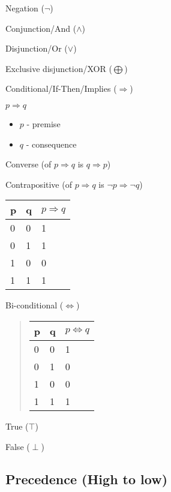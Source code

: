 \documentclass[12pt]{article}
\begin{document}
\begin{spacing}{1.5}
\begin{itemize*}
	\item Negation ($\neg$)
	\item Conjunction/And ($\wedge$)
	\item Disjunction/Or ($\vee$)
	\item Exclusive disjunction/XOR ($\bigoplus$)
	\item Conditional/If-Then/Implies ($\Rightarrow$)
		\begin{itemize*}
		    \item $p \Rightarrow q$
	    		\begin{itemize}
			        \item $p$ - premise
			        \item $q$ - consequence
		        \end{itemize}
		    \item Converse (of $p \Rightarrow q$ is $q \Rightarrow p$)
		    \item Contrapositive (of $p \Rightarrow q$ is $\neg p \Rightarrow \neg q$)
		    \item[]
				\begin{tabular}{ll | l}
					p & q & $p \Rightarrow q$ \\
					\hline
					0 & 0 & 1 \\
					0 & 1 & 1 \\
					1 & 0 & 0 \\
					1 & 1 & 1 
				\end{tabular}
    	\end{itemize*}
	\item Bi-conditional ($\Leftrightarrow$)
		\begin{quote}
			\begin{tabular}{ll | l}
				p & q & $p \Leftrightarrow q$ \\
				\hline
				0 & 0 & 1 \\
				0 & 1 & 0 \\
				1 & 0 & 0 \\
				1 & 1 & 1 
			\end{tabular}
		\end{quote}
		
	\item True ($\top$)
	\item False ($\perp$)
\end{itemize*}

\subsection{Precedence (High to low)} 


\end{spacing}
\end{document}
